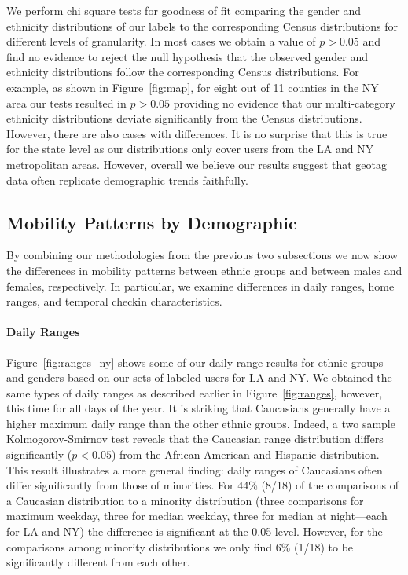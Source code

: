 We perform chi square tests for goodness of fit comparing the gender and ethnicity distributions of our labels to the corresponding Census distributions for different levels of granularity. In most cases we obtain a value of $p>0.05$ and find no evidence to reject the null hypothesis that the observed gender and ethnicity distributions follow the corresponding Census distributions. For example, as shown in Figure~\ref{fig:map}, for eight out of 11 counties in the NY area our tests resulted in $p>0.05$ providing no evidence that our multi-category ethnicity distributions deviate significantly from the Census distributions. However, there are also cases with differences. It is no surprise that this is true for the state level as our distributions only cover users from the LA and NY metropolitan areas. However, overall we believe our results suggest that geotag data often replicate demographic trends faithfully.

\subsection{Mobility Patterns by Demographic}
\label{sec:mobility-patterns-by-Demographic}

By combining our methodologies from the previous two subsections we now show the differences in mobility patterns between ethnic groups and between males and females, respectively. In particular, we examine differences in daily ranges, home ranges, and temporal checkin characteristics.

\paragraph{Daily Ranges}

Figure~\ref{fig:ranges_ny} shows some of our daily range results for ethnic groups and genders based on our sets of labeled users for LA and NY. We obtained the same types of daily ranges as described earlier in Figure~\ref{fig:ranges}, however, this time for all days of the year. It is striking that Caucasians generally have a higher maximum daily range than the other ethnic groups. Indeed, a two sample Kolmogorov-Smirnov test reveals that the Caucasian range distribution differs significantly ($p<0.05$) from the African American and Hispanic distribution. This result illustrates a more general finding: daily ranges of Caucasians often differ significantly from those of minorities. For 44\% (8/18) of the comparisons of a Caucasian distribution to a minority distribution (three comparisons for maximum weekday, three for median weekday, three for median at night---each for LA and NY) the difference is significant at the 0.05 level. However, for the comparisons among minority distributions we only find 6\% (1/18) to be significantly different from each other. 

